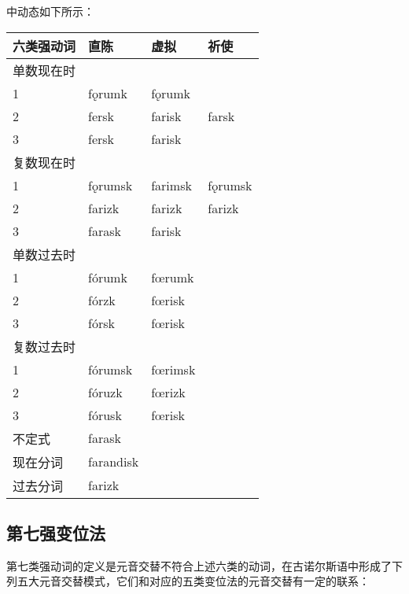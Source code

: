 中动态如下所示：

\begin{longtable}{llll}
    \toprule
    六类强动词 & 直陈      & 虚拟    & 祈使    \\
    \midrule
    \endhead
    \bottomrule
    \endfoot
    单数现在时 &           &         &         \\
    1          & fǫrumk    & fǫrumk  &         \\
    2          & fersk     & farisk  & farsk   \\
    3          & fersk     & farisk  &         \\
    复数现在时 &           &         &         \\
    1          & fǫrumsk   & farimsk & fǫrumsk \\
    2          & farizk    & farizk  & farizk  \\
    3          & farask    & farisk  &         \\
    单数过去时 &           &         &         \\
    1          & fórumk    & fœrumk  &         \\
    2          & fórzk     & fœrisk  &         \\
    3          & fórsk     & fœrisk  &         \\
    复数过去时 &           &         &         \\
    1          & fórumsk   & fœrimsk &         \\
    2          & fóruzk    & fœrizk  &         \\
    3          & fórusk    & fœrisk  &         \\
    不定式     & farask    &         &         \\
    现在分词   & farandisk &         &         \\
    过去分词   & farizk    &         &         \\
\end{longtable}

\subsection{第七强变位法}\label{第七强变位法}

第七类强动词的定义是元音交替不符合上述六类的动词，在古诺尔斯语中形成了下列五大元音交替模式，它们和对应的五类变位法的元音交替有一定的联系：

